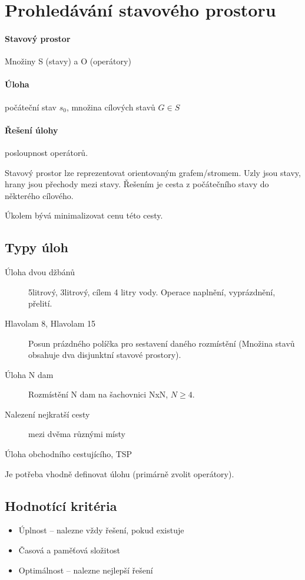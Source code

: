 \documentclass[a4wide]{report}
\begin{document}
\section{Prohledávání stavového prostoru}

\paragraph{Stavový prostor}
Množiny S (stavy) a O (operátory)

\paragraph{Úloha}
počáteční stav $s_0$, množina cílových stavů $G \in S$

\paragraph{Řešení úlohy}
posloupnost operátorů.

Stavový prostor lze reprezentovat orientovaným grafem/stromem. Uzly jsou stavy, hrany jsou přechody mezi stavy. Řešením je cesta z počátečního stavy do některého cílového.

Úkolem bývá minimalizovat cenu této cesty.

\subsection{Typy úloh}
\begin{description}
	\item[Úloha dvou džbánů] 5litrový, 3litrový, cílem 4 litry vody. Operace naplnění, vyprázdnění, přelití.
	\item[Hlavolam 8, Hlavolam 15] Posun prázdného políčka pro sestavení daného rozmístění (Množina stavů obsahuje dva disjunktní stavové prostory).
	\item[Úloha N dam] Rozmístění N dam na šachovnici NxN, $N \geq 4$.
	\item[Nalezení nejkratší cesty] mezi dvěma různými místy
	\item[Úloha obchodního cestujícího, TSP]
\end{description}

Je potřeba vhodně definovat úlohu (primárně zvolit operátory).

\subsection{Hodnotící kritéria}
\begin{itemize}
	\item Úplnost -- nalezne vždy řešení, pokud existuje
	\item Časová a paměťová složitost
	\item Optimálnost -- nalezne nejlepší řešení
\end{itemize}
\end{document}
